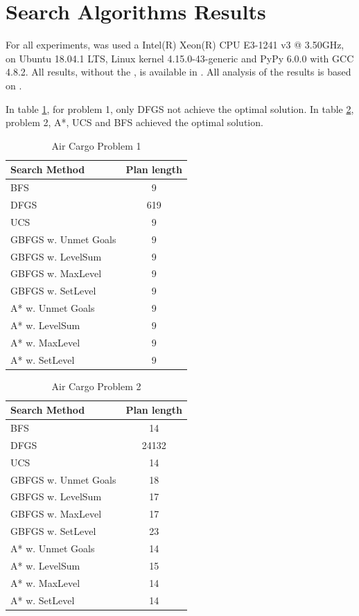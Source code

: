 \documentclass[a4paper]{article}
\begin{document}
\section{Search Algorithms Results}

For all experiments, was used a Intel(R) Xeon(R) CPU E3-1241 v3 @ 3.50GHz, on Ubuntu 18.04.1 LTS, Linux kernel 4.15.0-43-generic and PyPy 6.0.0 with GCC 4.8.2. All results, without the , is available in \cite{githubYsraellAIND}. All analysis of the results is based on \cite{russell2009artificial}.

In table \ref{airps1}, for problem 1, only DFGS not achieve the optimal solution. In table \ref{airps2}, problem 2, A*, UCS and BFS achieved the optimal solution. 

\begin{table}[htpb]
    \caption{Air Cargo Problem 1}
    \centering
    \begin{tabular}{ l | c }
    Search Method & Plan length \\ \hline 
BFS & 9 \\
DFGS & 619 \\
UCS & 9 \\
GBFGS w. Unmet Goals & 9 \\
GBFGS w. LevelSum & 9 \\
GBFGS w. MaxLevel & 9 \\
GBFGS w. SetLevel & 9 \\
A* w. Unmet Goals & 9 \\
A* w. LevelSum & 9 \\
A* w. MaxLevel & 9 \\
A* w. SetLevel & 9
\end{tabular}
    \label{airps1}
    \end{table}

    
\begin{table}[htpb]
    \caption{Air Cargo Problem 2}
    \centering
    \begin{tabular}{ l | c }
    Search Method & Plan length \\ \hline 
BFS & 14 \\
DFGS & 24132 \\
UCS & 14 \\
GBFGS w. Unmet Goals & 18 \\
GBFGS w. LevelSum & 17 \\
GBFGS w. MaxLevel & 17 \\
GBFGS w. SetLevel & 23 \\
A* w. Unmet Goals & 14 \\
A* w. LevelSum & 15 \\
A* w. MaxLevel & 14 \\
A* w. SetLevel & 14
\end{tabular}
    \label{airps2}
    \end{table}
\end{document}
